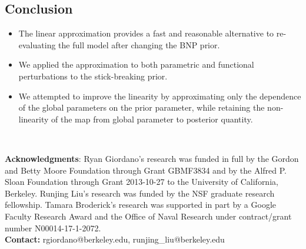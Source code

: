 \documentclass[a0,plainsections]{sciposter}\usepackage[]{graphicx}\usepackage[]{color}
\begin{document}
\begin{minipage}[t]{0.45\textwidth}
\begin{mdframed}[style=MyFrame]
\vspace{-0.6in}
\section*{Conclusion}
\vspace{-0.3in}
\begin{itemize}

\item The linear approximation provides a fast and reasonable alternative to re-evaluating the full model after changing the BNP prior. 

\item We applied the approximation to both parametric and functional perturbations to the stick-breaking prior.

\item We attempted to improve the linearity by approximating only the dependence of the global parameters on the prior parameter, while retaining the non-linearity of the map from global parameter to posterior quantity. 

\end{itemize}
\end{mdframed}

\end{minipage}\\

\begin{center}
\begin{minipage}[t]{\textwidth}
{\bf Acknowledgments}:
Ryan Giordano's research was funded in full by the
Gordon and Betty Moore Foundation through Grant GBMF3834 and by the Alfred P. Sloan Foundation through Grant 2013-10-27 to the University of California, Berkeley. Runjing Liu's research was funded by the NSF graduate research fellowship. Tamara Broderick's research was supported in part by a Google Faculty Research Award and the Office of Naval Research under contract/grant number N00014-17-1-2072.\\
{\bf Contact: } rgiordano@berkeley.edu, runjing\_liu@berkeley.edu
\end{minipage}
\end{center}
\end{document}
